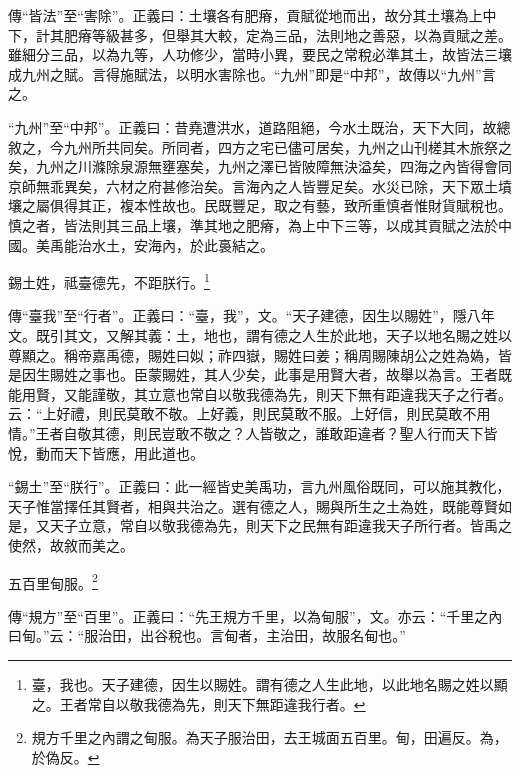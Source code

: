 {\noindent\zhuan{}\fzbyks 傳“皆法”至“害除”。正義曰：土壤各有肥瘠，貢賦從地而出，故分其土壤為上中下，計其肥瘠等級甚多，但舉其大較，定為三品，法則地之善惡，以為貢賦之差。雖細分三品，以為九等，人功修少，當時小異，要民之常稅必準其土，故皆法三壤成九州之賦。言得施賦法，以明水害除也。“九州”即是“中邦”，故傳以“九州”言之。 \par}

{\noindent\shu{}\fzkt “九州”至“中邦”。正義曰：昔堯遭洪水，道路阻絕，今水土既治，天下大同，故總敘之，今九州所共同矣。所同者，四方之宅已儘可居矣，九州之山刊槎其木旅祭之矣，九州之川滌除泉源無壅塞矣，九州之澤已皆陂障無決溢矣，四海之內皆得會同京師無乖異矣，六材之府甚修治矣。言海內之人皆豐足矣。水災已除，天下眾土墳壤之屬俱得其正，複本性故也。民既豐足，取之有藝，致所重慎者惟財貨賦稅也。慎之者，皆法則其三品上壤，準其地之肥瘠，為上中下三等，以成其貢賦之法於中國。美禹能治水土，安海內，於此裛結之。 \par}

錫土姓，祗臺德先，不距朕行。\footnote{臺，我也。天子建德，因生以賜姓。謂有德之人生此地，以此地名賜之姓以顯之。王者常自以敬我德為先，則天下無距違我行者。}

{\noindent\zhuan{}\fzbyks 傳“臺我”至“行者”。正義曰：“臺，我”，文。“天子建德，因生以賜姓”，隱八年文。既引其文，又解其義：土，地也，謂有德之人生於此地，天子以地名賜之姓以尊顯之。稱帝嘉禹德，賜姓曰姒；祚四嶽，賜姓曰姜；稱周賜陳胡公之姓為媯，皆是因生賜姓之事也。臣蒙賜姓，其人少矣，此事是用賢大者，故舉以為言。王者既能用賢，又能謹敬，其立意也常自以敬我德為先，則天下無有距違我天子之行者。云：“上好禮，則民莫敢不敬。上好義，則民莫敢不服。上好信，則民莫敢不用情。”王者自敬其德，則民豈敢不敬之？人皆敬之，誰敢距違者？聖人行而天下皆悅，動而天下皆應，用此道也。 \par}

{\noindent\shu{}\fzkt “錫土”至“朕行”。正義曰：此一經皆史美禹功，言九州風俗既同，可以施其教化，天子惟當擇任其賢者，相與共治之。選有德之人，賜與所生之土為姓，既能尊賢如是，又天子立意，常自以敬我德為先，則天下之民無有距違我天子所行者。皆禹之使然，故敘而美之。 \par}

五百里甸服。\footnote{規方千里之內謂之甸服。為天子服治田，去王城面五百里。甸，田遍反。為，於偽反。}

{\noindent\zhuan{}\fzbyks 傳“規方”至“百里”。正義曰：“先王規方千里，以為甸服”，文。亦云：“千里之內曰甸。”云：“服治田，出谷稅也。言甸者，主治田，故服名甸也。” \par}

